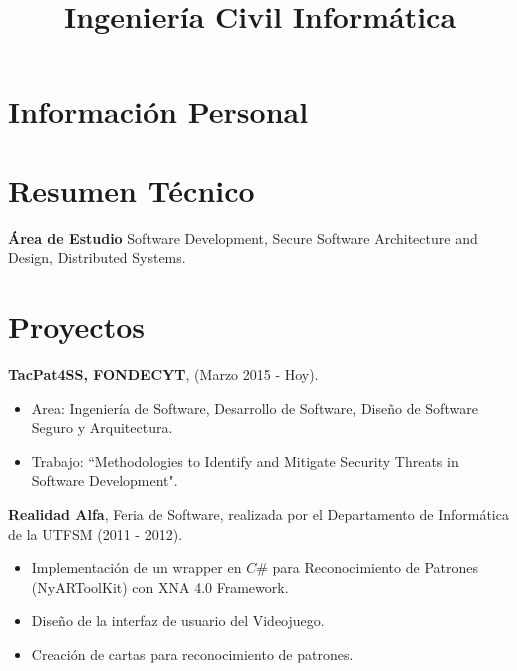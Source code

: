 \documentclass[10pt,a4paper,sans]{moderncv}        %
\title{Ingeniería Civil Informática}
\begin{document}
\makecvtitle


\section{Información Personal}

\section{Resumen Técnico}
    \vspace{1 mm}
    \textbf{Área de Estudio} \-\hspace{0.15cm}Software Development, Secure Software Architecture and Design, Distributed Systems.

\section{Proyectos}
\textbf{TacPat4SS, FONDECYT}, (Marzo 2015 - Hoy).
\begin{itemize}
	\item Area: Ingeniería de Software, Desarrollo de Software, Diseño de Software Seguro y Arquitectura.
	\item Trabajo: ``Methodologies to Identify and Mitigate Security Threats in Software Development".
\end{itemize}
\vspace{3 mm}
\textbf{Realidad Alfa}, Feria de Software, realizada por el Departamento de Informática de la UTFSM (2011 - 2012).
\begin{itemize}
	\item Implementación de un wrapper en \(C\#\) para Reconocimiento de Patrones (NyARToolKit) con XNA 4.0 Framework.
	\item Diseño de la interfaz de usuario del Videojuego.
	\item Creación de cartas para reconocimiento de patrones.
\end{itemize}
\end{document}

